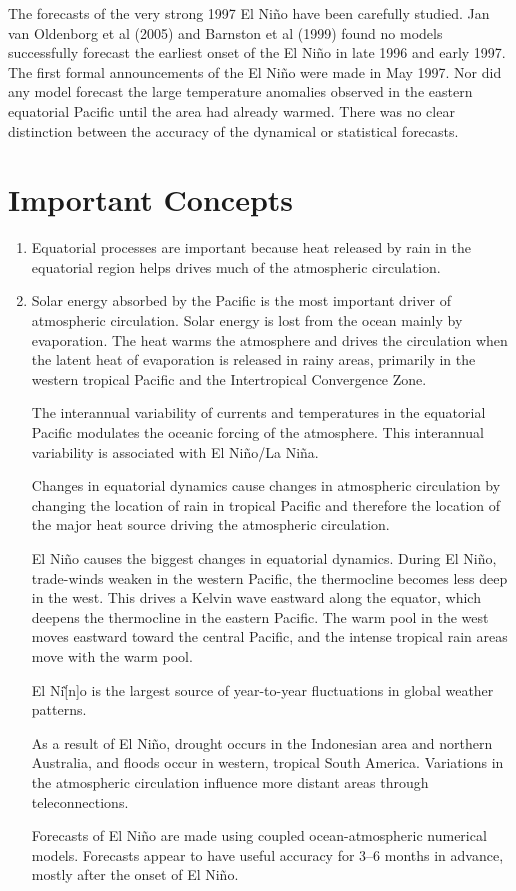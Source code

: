 The forecasts of the very strong 1997 El Ni\~{n}o have been carefully studied. Jan van Oldenborg et al (2005) and Barnston et al (1999) found no models successfully forecast the earliest onset of the El Ni\~{n}o in late 1996 and early 1997. The first formal announcements of the El Ni\~{n}o were made in May 1997. Nor did any model forecast the large temperature anomalies observed in the eastern equatorial Pacific until the area had already warmed. There was no clear distinction between the accuracy of the dynamical or statistical forecasts.

\section{Important Concepts}

\begin{enumerate}
\item
Equatorial processes are important because heat released by rain in the equatorial region helps drives much of the atmospheric circulation. 

\item
Solar energy absorbed by the Pacific is the most important driver of atmospheric circulation. Solar energy is lost from the ocean mainly by evaporation. The heat warms the atmosphere and drives the circulation when the latent heat of evaporation is released in rainy areas, primarily in the western tropical Pacific and the Intertropical Convergence Zone.

\vitem
The interannual variability of currents and temperatures in the equatorial Pacific modulates the oceanic forcing of the atmosphere. This interannual variability is associated with El Ni\~{n}o/La Ni\~{n}a.

\vitem
Changes in equatorial dynamics cause changes in atmospheric circulation by changing the location of rain in tropical Pacific and therefore the location of the major heat source driving the atmospheric circulation.

\vitem
El Ni\~{n}o causes the biggest changes in equatorial dynamics. During El Ni\~{n}o, trade-winds
weaken in the western Pacific, the thermocline becomes less deep
in the west. This drives a Kelvin wave eastward along the
equator, which deepens the thermocline in the eastern Pacific. The warm pool in the west moves
eastward toward the central Pacific, and the intense tropical rain areas move with the warm
pool.

\vitem
El Ni\~[n]o is the largest source of year-to-year fluctuations in global weather patterns.

\vitem
As a result of  El Ni\~{n}o, drought occurs in the Indonesian area and northern Australia, and
floods occur in western, tropical South America. Variations in the atmospheric circulation
influence more distant areas through teleconnections.

\vitem
Forecasts of El Ni\~{n}o are made using coupled ocean-atmospheric numerical models. Forecasts
appear to have useful accuracy for 3--6 months in
advance, mostly after the onset of El Ni\~{n}o.
\end{enumerate}


